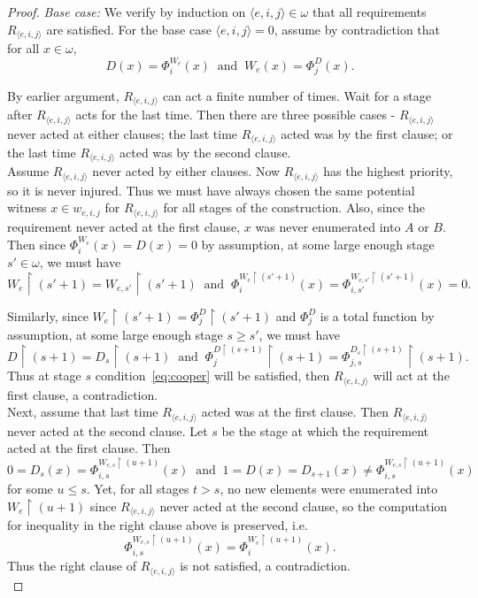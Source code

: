 \documentclass{article}
\begin{document}
\begin{proof}
    \textit{Base case:} We verify by induction on $\langle
    e,i,j\rangle\in\omega$ that all requirements $R_{\langle e,i,j\rangle}$
    are satisfied. For the base case $\langle e,i,j\rangle=0$, assume by
    contradiction that for all $x\in\omega$,
    \[D(x)=\Phi_i^{W_e}(x)\;\; \text{and}\;\; W_e(x)=\Phi_j^D(x).\]

    By earlier argument, $R_{\langle e,i,j\rangle}$ can act a finite number
    of times. Wait for a stage after $R_{\langle e,i,j\rangle}$ acts for
    the last time. Then there are three possible cases - $R_{\langle
    e,i,j\rangle}$ never acted at either clauses; the last time $R_{\langle
    e,i,j\rangle}$ acted was by the first clause; or the last time
    $R_{\langle e,i,j\rangle}$ acted was by the second clause. \\

    Assume $R_{\langle e,i,j\rangle}$ never acted by either clauses.
    Now $R_{\langle e,i,j\rangle}$ has the highest priority, so it is never
    injured. Thus we must have always chosen the same potential witness
    $x\in w_{e,i,j}$ for $R_{\langle e,i,j\rangle}$ for all stages of the
    construction. Also, since the requirement never acted at the first
    clause, $x$ was never enumerated into $A$ or $B$. Then since
    $\Phi_i^{W_e}(x)=D(x)=0$ by assumption, at some large enough stage
    $s'\in\omega$, we must have
    \[W_e\restriction (s'+1) =W_{e,s'}\restriction (s'+1)\;\;
    \text{and}\;\; \Phi_{i}^{W_{e} \restriction (s'+1)}(x)
    =\Phi_{i,s'}^{W_{e,s'} \restriction (s'+1)}(x)=0.\]

    Similarly, since $W_e\restriction(s'+1) =\Phi_j^D\restriction(s'+1)$
    and $\Phi_j^D$ is a total function by assumption, at some large enough
    stage $s\geq s'$, we must have
    \[D\restriction(s+1) =D_{s}\restriction(s+1)\;\;
    \text{and}\;\; \Phi_{j}^{D\restriction(s+1)}
    \restriction(s+1) =\Phi_{j,s}^{D_{s}\restriction(s+1)}
    \restriction(s+1).\]
    Thus at stage $s$ condition~\eqref{eq:cooper} will be satisfied, then
    $R_{\langle e,i,j\rangle}$ will act at the first clause, a
    contradiction. \\

    Next, assume that last time $R_{\langle e,i,j\rangle}$ acted was
    at the first clause. Then $R_{\langle e,i,j\rangle}$ never acted
    at the second clause. Let $s$ be the stage at which the requirement
    acted at the first clause. Then
    \[0=D_s(x) =\Phi_{i,s}^{W_{e,s}\restriction (u+1)} (x)\;\;
    \text{and}\;\; 1=D(x)=D_{s+1}(x) \neq\Phi_{i,s}^{W_{e,s}\restriction
    (u+1)} (x)\]
    for some $u\leq s$. Yet, for all stages $t>s$, no new elements were
    enumerated into $W_e\restriction (u+1)$ since $R_{\langle
    e,i,j\rangle}$ never acted at the second clause, so the computation
    for inequality in the right clause above is preserved, i.e.
    \[\Phi_{i,s}^{W_{e,s}\restriction (u+1)} (x)
    =\Phi_{i}^{W_{e}\restriction (u+1)} (x).\]
    Thus the right clause of $R_{\langle e,i,j\rangle}$ is not satisfied, a
    contradiction. \\


\end{proof}
\end{document}
